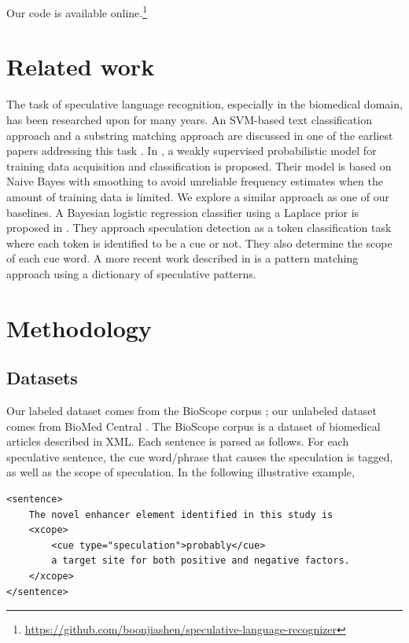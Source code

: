 \documentclass{article}
\begin{document}
Our code is available online.\footnote{
\url{https://github.com/boonjiashen/speculative-language-recognizer}}

\section{Related work}
The task of speculative language recognition, especially in the biomedical domain, has been researched upon for many years. An SVM-based text classification approach and a substring matching approach are discussed in one of the earliest papers addressing this task \autocite{Light2004}. In \textcite{Medlock2007}, a weakly supervised probabilistic model for training data acquisition and classification is proposed. Their model is based on Naive Bayes with smoothing to avoid unreliable frequency estimates when the amount of training data is limited. We explore a similar approach as one of our baselines. A Bayesian logistic regression classifier using a Laplace prior is proposed in \textcite{vlachos2010detecting}. They approach speculation detection as a token classification task where each token is identified to be a cue or not. They also determine the scope of each cue word. A more recent work described in \textcite{Malhotra2013} is a pattern matching approach using a dictionary of speculative patterns. 


\section{Methodology}

\subsection{Datasets}
Our labeled dataset comes from the BioScope corpus \autocite{bioscope}; our unlabeled dataset comes from BioMed Central \autocite{biomed}. The BioScope corpus is a dataset of biomedical articles described in XML. Each sentence is parsed as follows. For each speculative sentence, the cue word/phrase that causes the speculation is tagged, as well as the scope of speculation. In the following illustrative example,

\begin{verbatim}
<sentence> 
    The novel enhancer element identified in this study is 
    <xcope> 
        <cue type="speculation">probably</cue> 
        a target site for both positive and negative factors.
    </xcope>
</sentence>
\end{verbatim}
\end{document}
